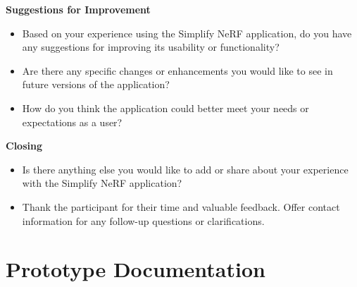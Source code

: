 \textbf{Suggestions for Improvement}
\begin{itemize}
\item Based on your experience using the Simplify NeRF application, do you have any suggestions for improving its usability or functionality?
\item Are there any specific changes or enhancements you would like to see in future versions of the application?
\item How do you think the application could better meet your needs or expectations as a user?
\end{itemize}

\textbf{Closing}
\begin{itemize}
\item Is there anything else you would like to add or share about your experience with the Simplify NeRF application?
\item Thank the participant for their time and valuable feedback.
Offer contact information for any follow-up questions or clarifications.
\end{itemize}

\section{Prototype Documentation}
\label{sec:appendix:prototype-doc}


